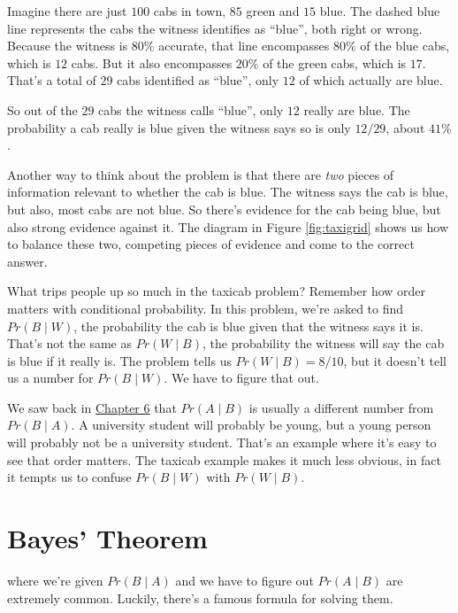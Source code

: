 \documentclass[justified]{tufte-book}
\newcommand{\given}{\mid}
\newcommand{\p}{Pr}
\theoremstyle{definition}
\theoremstyle{definition}
\theoremstyle{definition}
\theoremstyle{remark}
\begin{document}
Imagine there are just \(100\) cabs in town, \(85\) green and \(15\) blue. The dashed blue line represents the cabs the witness identifies as
``blue'', both right or wrong. Because the witness is \(80\%\) accurate, that line encompasses \(80\%\) of the blue cabs, which is \(12\) cabs. But it also encompasses \(20\%\) of the green cabs, which is \(17\). That's a total of \(29\) cabs identified as ``blue'', only \(12\) of which actually are blue.

So out of the \(29\) cabs the witness calls ``blue'', only \(12\) really are blue. The probability a cab really is blue given the witness says so is only \(12/29\), about \(41\%\).

Another way to think about the problem is that there are \emph{two} pieces of information relevant to whether the cab is blue. The witness says the cab is blue, but also, most cabs are not blue. So there's evidence for the cab being blue, but also strong evidence against it. The diagram in Figure \ref{fig:taxigrid} shows us how to balance these two, competing pieces of evidence and come to the correct answer.

What trips people up so much in the taxicab problem? Remember how order matters with conditional probability. In this problem, we're asked to find \(\p(B \given W)\), the probability the cab is blue given that the witness says it is. That's not the same as \(\p(W \given B)\), the probability the witness will say the cab is blue if it really is. The problem tells us \(\p(W \given B) = 8/10\), but it doesn't tell us a number for \(\p(B \given W)\). We have to figure that out.

We saw back in \protect\hyperlink{conditional-probability}{Chapter 6} that \(\p(A \given B)\) is usually a different number from \(\p(B \given A)\). A university student will probably be young, but a young person will probably not be a university student. That's an example where it's easy to see that order matters. The taxicab example makes it much less obvious, in fact it tempts us to confuse \(\p(B \given W)\) with \(\p(W \given B)\).

\hypertarget{bayes-theorem}{%
\section{Bayes' Theorem}\label{bayes-theorem}}

 where we're given \(\p(B \given A)\) and we have to figure out \(\p(A \given B)\) are extremely common. Luckily, there's a famous formula for solving them.
\end{document}

